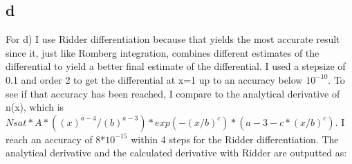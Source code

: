 \subsection*{d}

For d) I use Ridder differentiation because that yields the most accurate result since it, just like Romberg integration, combines different estimates of the differential to yield a better final estimate of the differential.
I used a stepsize of 0.1
and order 2 to get the differential at x=1 up to an accuracy below $10^{-10}$. To see if that accuracy has been
reached, I compare to the analytical derivative of n(x), which is 
$Nsat* A*((x)^{a-4}/(b)^{a-3})*exp(-(x/b)^c)*(a-3-c*(x/b)^c)$.
I reach an accuracy of 8*$10^{-15}$ within 4 steps for the Ridder differentiation.
The analytical derivative and the calculated derivative with Ridder are outputted as:



